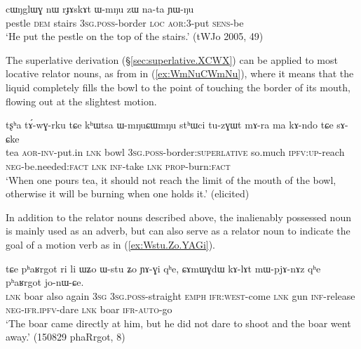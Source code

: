 \begin{exe}
\ex \label{ex:rJAskAt.WmNu}
\gll  cɯŋglɯɣ nɯ rɟɤskɤt ɯ-mŋu zɯ na-ta ɲɯ-ŋu \\
 pestle \textsc{dem} stairs \textsc{3sg}.\textsc{poss}-border \textsc{loc} \textsc{aor}:3\flobv{}-put \textsc{sens}-be \\
 \glt `He put the pestle on the top of the stairs.' (tWJo 2005, 49)
\end{exe} 

The superlative derivation (§\ref{sec:superlative.XCWX}) can be applied to most locative relator nouns, as  from   in (\ref{ex:WmNuCWmNu}), where it means that the liquid completely fills the bowl to the point of touching the border of its mouth, flowing out at the slightest motion.

\begin{exe}
\ex \label{ex:WmNuCWmNu}
\gll  tʂʰa tɤ́-wɣ-rku tɕe kʰɯtsa ɯ-mŋuɕɯmŋu stʰɯci tu-zɣɯt mɤ-ra ma kɤ-ndo tɕe sɤ-ɕke \\
tea \textsc{aor}-\textsc{inv}-put.in \textsc{lnk} bowl \textsc{3sg}.\textsc{poss}-border:\textsc{superlative} so.much \textsc{ipfv}:\textsc{up}-reach \textsc{neg}-be.needed:\textsc{fact} \textsc{lnk} \textsc{inf}-take \textsc{lnk} \textsc{prop}-burn:\textsc{fact} \\
\glt `When one pours tea, it should not reach the limit of the mouth of the bowl, otherwise it will be burning when one holds it.' (elicited)
\end{exe} 

In addition to the relator nouns described above, the inalienably possessed noun  is mainly used as an adverb, but can also serve as a relator noun to indicate the goal of a motion verb as in (\ref{ex:Wstu.Zo.YAGi}).

\begin{exe}
\ex \label{ex:Wstu.Zo.YAGi}
\gll  tɕe pʰaʁrgot ri li ɯʑo ɯ-stu ʑo ɲɤ-ɣi qʰe,  ɕɤmɯɣdɯ kɤ-lɤt mɯ-pjɤ-nɤz qʰe pʰaʁrgot jo-nɯ-ɕe. \\
\textsc{lnk} boar also again \textsc{3sg} \textsc{3sg}.\textsc{poss}-straight \textsc{emph} \textsc{ifr}:\textsc{west}-come \textsc{lnk} gun \textsc{inf}-release \textsc{neg}-\textsc{ifr}.\textsc{ipfv}-dare \textsc{lnk} boar \textsc{ifr}-\textsc{auto}-go \\
\glt `The boar came directly at him, but he did not dare to shoot and the boar went away.' (150829 phaRrgot, 8)
\end{exe} 


